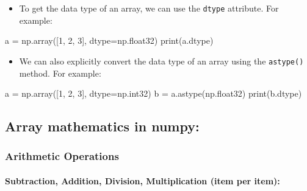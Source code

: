 \documentclass[11pt]{article}
\providecommand{\tightlist}{%
      \setlength{\itemsep}{0pt}\setlength{\parskip}{0pt}}
\newenvironment{Shaded}{}{}
\newcommand{\DecValTok}[1]{\textcolor[rgb]{0.25,0.63,0.44}{{#1}}}
\newcommand{\NormalTok}[1]{{#1}}
\newcommand{\OperatorTok}[1]{\textcolor[rgb]{0.40,0.40,0.40}{{#1}}}
\newcommand{\BuiltInTok}[1]{{#1}}
\begin{document}
\begin{itemize}
\tightlist
\item
  To get the data type of an array, we can use the \texttt{dtype}
  attribute. For example:
\end{itemize}

\begin{Shaded}
\begin{Highlighting}[]
\NormalTok{a }\OperatorTok{=}\NormalTok{ np.array([}\DecValTok{1}\NormalTok{, }\DecValTok{2}\NormalTok{, }\DecValTok{3}\NormalTok{], dtype}\OperatorTok{=}\NormalTok{np.float32)}
\BuiltInTok{print}\NormalTok{(a.dtype)}
\end{Highlighting}
\end{Shaded}

\begin{itemize}
\tightlist
\item
  We can also explicitly convert the data type of an array using the
  \texttt{astype()} method. For example:
\end{itemize}

\begin{Shaded}
\begin{Highlighting}[]
\NormalTok{a }\OperatorTok{=}\NormalTok{ np.array([}\DecValTok{1}\NormalTok{, }\DecValTok{2}\NormalTok{, }\DecValTok{3}\NormalTok{], dtype}\OperatorTok{=}\NormalTok{np.int32)}
\NormalTok{b }\OperatorTok{=}\NormalTok{ a.astype(np.float32)}
\BuiltInTok{print}\NormalTok{(b.dtype)}
\end{Highlighting}
\end{Shaded}

\hypertarget{array-mathematics-in-numpy}{%
\subsection{Array mathematics in
numpy:}\label{array-mathematics-in-numpy}}

\hypertarget{arithmetic-operations}{%
\subsubsection{Arithmetic Operations}\label{arithmetic-operations}}

\hypertarget{subtraction-addition-division-multiplication-item-per-item}{%
\paragraph{Subtraction, Addition, Division, Multiplication (item per
item):}\label{subtraction-addition-division-multiplication-item-per-item}}
\end{document}
